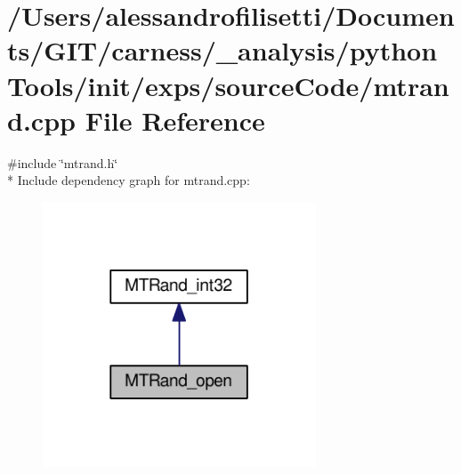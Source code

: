 \hypertarget{a00070}{\section{/\-Users/alessandrofilisetti/\-Documents/\-G\-I\-T/carness/\-\_\-analysis/python\-Tools/init/exps/source\-Code/mtrand.cpp File Reference}
\label{a00070}
}
{\ttfamily \#include \char`\"{}mtrand.\-h\char`\"{}}\\*
Include dependency graph for mtrand.\-cpp\-:
\nopagebreak
\begin{figure}[H]
\begin{center}
\leavevmode
\includegraphics[width=230pt]{a00190}
\end{center}
\end{figure}
